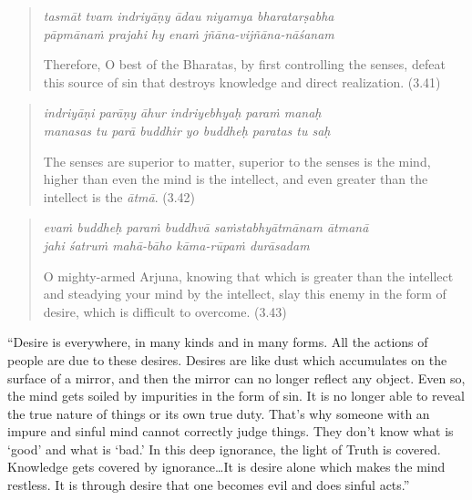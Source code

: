 \documentclass[12pt, twoside, openright]{memoir}
\begin{document}
\par
\begin{verse}
\textit{tasmāt tvam indriyāṇy ādau niyamya bharatarṣabha} \\
\textit{pāpmānaṁ prajahi hy enaṁ jñāna-vijñāna-nāśanam}

\noindent Therefore, O best of the Bharatas, by first controlling the senses, defeat this source of sin that destroys knowledge and direct realization. (3.41)
\end{verse}
\par



\par
\begin{verse}
\textit{indriyāṇi parāṇy āhur indriyebhyaḥ paraṁ manaḥ} \\
\textit{manasas tu parā buddhir yo buddheḥ paratas tu saḥ}

\noindent The senses are superior to matter, superior to the senses is the mind, higher than even the mind is the intellect, and even greater than the intellect is the \textit{ātmā}. (3.42)
\end{verse}
\par



\par
\begin{verse}
\textit{evaṁ buddheḥ paraṁ buddhvā saṁstabhyātmānam ātmanā} \\
\textit{jahi śatruṁ mahā-bāho kāma-rūpaṁ durāsadam}

\noindent O mighty-armed Arjuna, knowing that which is greater than the intellect and steadying your mind by the intellect, slay this enemy in the form of desire, which is difficult to overcome. (3.43)
\end{verse}
\par


\enquote{Desire is everywhere, in many kinds and in many forms. All the actions of people are due to these desires. Desires are like dust which accumulates on the surface of a mirror, and then the mirror can no longer reflect any object. Even so, the mind gets soiled by impurities in the form of sin. It is no longer able to reveal the true nature of things or its own true duty. That’s why someone with an impure and sinful mind cannot correctly judge things. They don’t know what is \enquote{good} and what is \enquote{bad.} In this deep ignorance, the light of Truth is covered. Knowledge gets covered by ignorance\ldots It is desire alone which makes the mind restless. It is through desire that one becomes evil and does sinful acts.}
\end{document}
